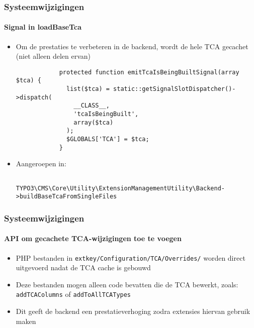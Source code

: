 \begin{frame}[fragile]
	\frametitle{Systeemwijzigingen}
	\framesubtitle{Signal in loadBaseTca}

	\lstset{
		basicstyle=\tiny\ttfamily
	}

	\begin{itemize}
		\item Om de prestaties te verbeteren in de backend, wordt de hele
			TCA gecachet (niet alleen delen ervan)

		\begin{lstlisting}
			protected function emitTcaIsBeingBuiltSignal(array $tca) {
			  list($tca) = static::getSignalSlotDispatcher()->dispatch(
			    __CLASS__,
			    'tcaIsBeingBuilt',
			    array($tca)
			  );
			  $GLOBALS['TCA'] = $tca;
			}
		\end{lstlisting}

		\item Aangeroepen in:

			\begin{lstlisting}
				TYPO3\CMS\Core\Utility\ExtensionManagementUtility\Backend->buildBaseTcaFromSingleFiles
			\end{lstlisting}

	\end{itemize}

\end{frame}  


\begin{frame}[fragile]
	\frametitle{Systeemwijzigingen}
	\framesubtitle{API om gecachete TCA-wijzigingen toe te voegen}

	\begin{itemize}
		\item PHP bestanden in \texttt{extkey/Configuration/TCA/Overrides/}
			worden direct uitgevoerd nadat de TCA cache is gebouwd

		\item Deze bestanden mogen alleen code bevatten die de TCA bewerkt,\newline
			zoals: \texttt{addTCAColumns} of \texttt{addToAllTCATypes}

		\item Dit geeft de backend een prestatieverhoging zodra extensies hiervan gebruik maken

	\end{itemize}

\end{frame} 

